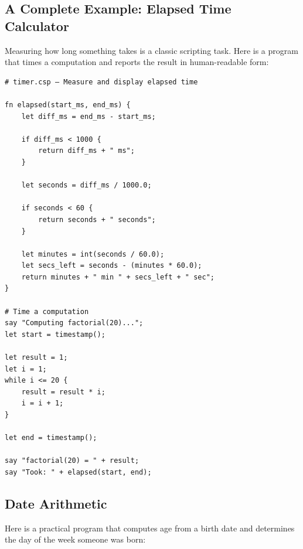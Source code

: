 \clearpage
\subsection{A Complete Example: Elapsed Time Calculator}

Measuring how long something takes is a classic scripting task. Here is a program that times a computation and reports the result in human-readable form:

\begin{tcolorbox}[colback=codebg, colframe=darkpurple, colbacktitle=darkpurple, title=\textbf{\textcolor{codegold}{Elapsed Time Calculator (timer.csp)}}, fonttitle=\bfseries, sharp corners]
\begin{lstlisting}
# timer.csp — Measure and display elapsed time

fn elapsed(start_ms, end_ms) {
    let diff_ms = end_ms - start_ms;

    if diff_ms < 1000 {
        return diff_ms + " ms";
    }

    let seconds = diff_ms / 1000.0;

    if seconds < 60 {
        return seconds + " seconds";
    }

    let minutes = int(seconds / 60.0);
    let secs_left = seconds - (minutes * 60.0);
    return minutes + " min " + secs_left + " sec";
}

# Time a computation
say "Computing factorial(20)...";
let start = timestamp();

let result = 1;
let i = 1;
while i <= 20 {
    result = result * i;
    i = i + 1;
}

let end = timestamp();

say "factorial(20) = " + result;
say "Took: " + elapsed(start, end);
\end{lstlisting}
\end{tcolorbox}

\clearpage
\subsection{Date Arithmetic}

Here is a practical program that computes age from a birth date and determines the day of the week someone was born:

